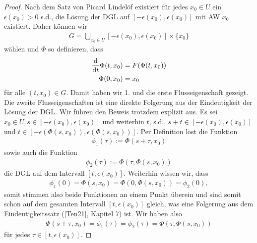\begin{proof}
 Nach dem Satz von Picard Lindelöf existiert für jedes \(x_0\in U\) ein \(\epsilon(x_0)>0\) s.d., die Lösung der DGL
auf \([-\epsilon(x_0),\epsilon(x_0)]\) mit AW \(x_0\) existiert. Daher können wir
\begin{align*}
G = \bigcup_{x_0\in U} [-\epsilon(x_0),\epsilon(x_0)] \times\{x_0\}
\end{align*}
wählen und \(\Phi\) so definieren, dass
\begin{align*}
\frac{\mathrm{d}}{\mathrm{d} t} \Phi(t, x_0) &= F(\Phi(t, x_0))\\
\Phi(0, x_0) &= x_0
\end{align*}
für alle \((t, x_0)\in G\). Damit haben wir 1. und die erste Flusseigenschaft gezeigt. Die zweite Flusseigenschaften ist eine direkte Folgerung aus der Eindeutigkeit der Lösung der DGL. Wir führen den Beweis trotzdem explizit aus. Es sei \(x_0\in U, s\in [-\epsilon(x_0), \epsilon(x_0)]\) und weiterhin \(t\), s.d., \(s+t \in [-\epsilon(x_0), \epsilon(x_0)]\) und \(t\in [-\epsilon(\Phi(s,x_0)), \epsilon(\Phi(s,x_0))]\).
Per Definition löst die Funktion
\begin{align*}
\phi_1(\tau) := \Phi(s + \tau, x_0)
\end{align*}
sowie auch die Funktion
\begin{align*}
\phi_2(\tau) := \Phi(\tau, \Phi(s,x_0))
\end{align*}
die DGL auf dem Intervall \([t, \epsilon(x_0)]\). Weiterhin wissen wir, dass
\begin{align*}
\phi_1(0) = \Phi(s, x_0) = \Phi(0, \Phi(s, x_0)) = \phi_2(0),
\end{align*}
somit stimmen also beide Funktionen an einem Punkt überein und sind somit schon auf dem gesamten Intervall \([t, \epsilon(x_0)]\) gleich, was
eine Folgerung aus dem Eindeutigkeitssatz ({[}\hyperlink{cite.references:id7}{Ten21}{]}, Kapitel 7) ist. Wir haben also
\begin{align*}
\Phi(s + \tau, x_0) = \phi_1(\tau) = \phi_2(\tau) = \Phi(\tau, \Phi(s,x_0))
\end{align*}
für jedes \(\tau\in [t, \epsilon(x_0)]\).
\end{proof}


